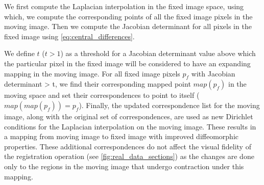 

We first compute the Laplacian interpolation in the fixed image space, using which, we compute the corresponding points of all the fixed image pixels in the moving image. Then we compute the Jacobian determinant for all pixels in the fixed image using \autoref{eq:central_differences}. 


We define $t$ ($t>1$) as a threshold for a Jacobian determinant value above which the particular pixel in the fixed image will be considered to have an expanding mapping in the moving image. For all fixed image pixels $p_f$ with Jacobian determinant > t, we find their corresponding mapped point $map(p_f)$ in the moving space and set their correspondences to point to itself ($map(map(p_f))=p_f$).
Finally, the updated correspondence list for the moving image, along with the original set of correspondences, are used as new Dirichlet conditions for the Laplacian interpolation on the moving image. These results in a mapping from moving image to fixed image with improved diffeomorphic properties.
These additional correspondences do not affect the visual fidelity of the registration operation (see \autoref{fig:real_data_sections}) as the changes are done only to the regions in the moving image that undergo contraction under this mapping. 



 


